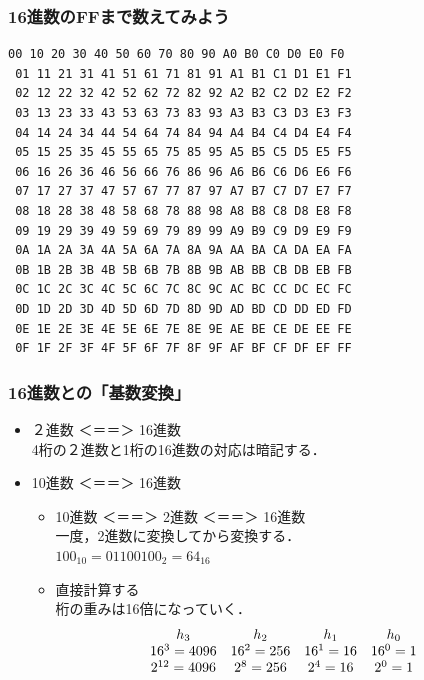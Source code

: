 \documentclass[handout]{beamer}        %
\begin{document}
\begin{frame}[fragile]
  \frametitle{16進数のFFまで数えてみよう}
  \begin{lstlisting}[basicstyle={\ttfamily},frame=none]
 00 10 20 30 40 50 60 70 80 90 A0 B0 C0 D0 E0 F0
 01 11 21 31 41 51 61 71 81 91 A1 B1 C1 D1 E1 F1
 02 12 22 32 42 52 62 72 82 92 A2 B2 C2 D2 E2 F2
 03 13 23 33 43 53 63 73 83 93 A3 B3 C3 D3 E3 F3
 04 14 24 34 44 54 64 74 84 94 A4 B4 C4 D4 E4 F4
 05 15 25 35 45 55 65 75 85 95 A5 B5 C5 D5 E5 F5
 06 16 26 36 46 56 66 76 86 96 A6 B6 C6 D6 E6 F6
 07 17 27 37 47 57 67 77 87 97 A7 B7 C7 D7 E7 F7
 08 18 28 38 48 58 68 78 88 98 A8 B8 C8 D8 E8 F8
 09 19 29 39 49 59 69 79 89 99 A9 B9 C9 D9 E9 F9
 0A 1A 2A 3A 4A 5A 6A 7A 8A 9A AA BA CA DA EA FA
 0B 1B 2B 3B 4B 5B 6B 7B 8B 9B AB BB CB DB EB FB
 0C 1C 2C 3C 4C 5C 6C 7C 8C 9C AC BC CC DC EC FC
 0D 1D 2D 3D 4D 5D 6D 7D 8D 9D AD BD CD DD ED FD
 0E 1E 2E 3E 4E 5E 6E 7E 8E 9E AE BE CE DE EE FE
 0F 1F 2F 3F 4F 5F 6F 7F 8F 9F AF BF CF DF EF FF
  \end{lstlisting}

\end{frame}

\begin{frame}
  \frametitle{16進数との「基数変換」}

  \begin{itemize}
  \item ２進数 ＜＝＝＞ 16進数 \\
    4桁の２進数と1桁の16進数の対応は暗記する．
  \item 10進数 ＜＝＝＞ 16進数 \\
    \begin{itemize}
    \item 10進数 ＜＝＝＞ 2進数 ＜＝＝＞ 16進数 \\
      一度，2進数に変換してから変換する．\\
      $100_{10} = 0110 0100_2 = 64_{16}$
    \item 直接計算する \\
      桁の重みは16倍になっていく．
      \[
        \begin{array}{c c c c c }
          h_3     & h_2     & h_1     & h_0     \\
          16^3 = 4096 & 16^2 = 256 & 16^1 = 16 & 16^0 = 1 \\
          2^{12} = 4096 & 2^8 = 256 & 2^4 = 16 & 2^0 = 1 \\
        \end{array}
        \]
    \end{itemize}
  \end{itemize}
\end{frame}
\end{document}

